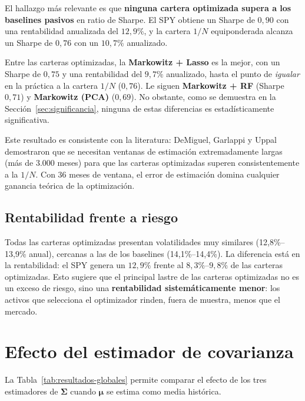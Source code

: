 El hallazgo más relevante es que \textbf{ninguna cartera optimizada supera
a los baselines pasivos} en ratio de Sharpe. El SPY obtiene un Sharpe de
$0{,}90$ con una rentabilidad anualizada del $12{,}9\%$, y la cartera
$1/N$ equiponderada alcanza un Sharpe de $0{,}76$ con un $10{,}7\%$
anualizado.

Entre las carteras optimizadas, la \textbf{Markowitz + Lasso} es la mejor,
con un Sharpe de $0{,}75$ y una rentabilidad del $9{,}7\%$ anualizado, hasta
el punto de \emph{igualar} en la práctica a la cartera $1/N$ ($0{,}76$).
Le siguen \textbf{Markowitz + RF} (Sharpe $0{,}71$) y \textbf{Markowitz (PCA)}
($0{,}69$). No obstante, como se demuestra en la
Sección~\ref{sec:significancia}, ninguna de estas diferencias es
estadísticamente significativa.

Este resultado es consistente con la literatura: DeMiguel, Garlappi y Uppal
\cite{DeMiguel2009} demostraron que se necesitan ventanas de estimación
extremadamente largas (más de 3.000 meses) para que las carteras optimizadas
superen consistentemente a la $1/N$. Con 36 meses de ventana, el error de
estimación domina cualquier ganancia teórica de la optimización.

\subsection{Rentabilidad frente a riesgo}

Todas las carteras optimizadas presentan volatilidades muy similares
(12,8\%--13,9\% anual), cercanas a las de los baselines (14,1\%--14,4\%).
La diferencia está en la rentabilidad: el SPY genera un $12{,}9\%$ frente
al $8{,}3\%$--$9{,}8\%$ de las carteras optimizadas. Esto sugiere que el
principal lastre de las carteras optimizadas no es un exceso de riesgo,
sino una \textbf{rentabilidad sistemáticamente menor}: los activos que
selecciona el optimizador rinden, fuera de muestra, menos que el mercado.

\section{Efecto del estimador de covarianza}

La Tabla~\ref{tab:resultados-globales} permite comparar el efecto de los
tres estimadores de $\boldsymbol{\Sigma}$ cuando $\boldsymbol{\mu}$ se
estima como media histórica.

